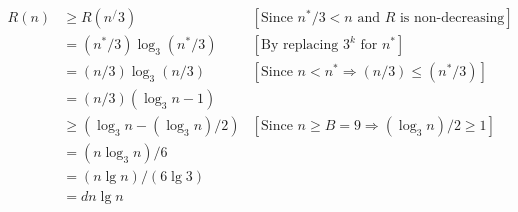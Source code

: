 \documentclass[12pt]{article}
\begin{document}
\begin{itemize}
\begin{mdframed}
\begin{enumerate}[1.]
\begin{mdframed}
            \begin{align}
                R(n)&\geq R(n^/3) & [\text{Since $n^*/3 < n$ and $R$ is non-decreasing}]\\
                &= (n^*/3)\log_3 (n^*/3) & [\text{By replacing $3^k$ for $n^*$}]\\
                &= (n/3)\log_3 (n/3) & [\text{Since $n < n^* \Rightarrow (n/3) \leq (n^*/3)$}]\\
                &= (n/3)(\log_3 n - 1)\\
                &\geq (\log_3 n - (\log_3 n)/2)& [\text{Since $n \geq B = 9 \Rightarrow (\log_3 n)/2 \geq 1$}]\\
                &= (n\log_3 n)/6\\
                &= (n\lg n)/(6\lg 3)\\
                &= dn\lg n
            \end{align}

            \end{mdframed}
        \end{enumerate}

    \end{mdframed}

\end{itemize}
\end{document}
